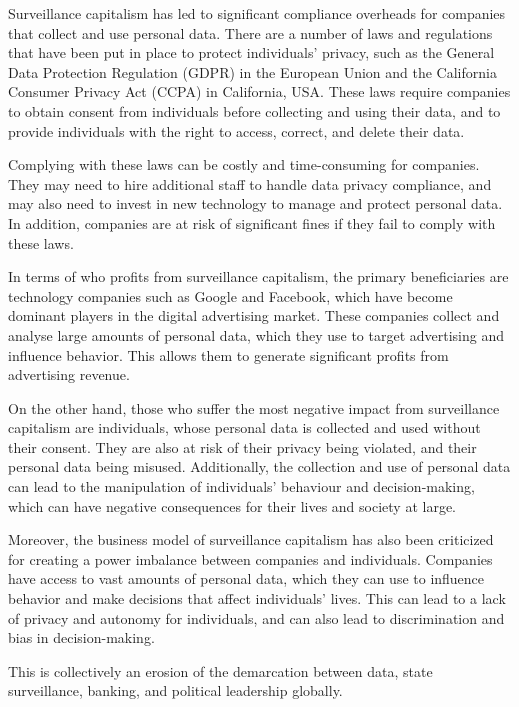 Surveillance capitalism has led to significant compliance overheads for companies that collect and use personal data. There are a number of laws and regulations that have been put in place to protect individuals' privacy, such as the General Data Protection Regulation (GDPR) in the European Union and the California Consumer Privacy Act (CCPA) in California, USA. These laws require companies to obtain consent from individuals before collecting and using their data, and to provide individuals with the right to access, correct, and delete their data.\par 
Complying with these laws can be costly and time-consuming for companies. They may need to hire additional staff to handle data privacy compliance, and may also need to invest in new technology to manage and protect personal data. In addition, companies are at risk of significant fines if they fail to comply with these laws.\par
In terms of who profits from surveillance capitalism, the primary beneficiaries are technology companies such as Google and Facebook, which have become dominant players in the digital advertising market. These companies collect and analyse large amounts of personal data, which they use to target advertising and influence behavior. This allows them to generate significant profits from advertising revenue.\par
On the other hand, those who suffer the most negative impact from surveillance capitalism are individuals, whose personal data is collected and used without their consent. They are also at risk of their privacy being violated, and their personal data being misused. Additionally, the collection and use of personal data can lead to the manipulation of individuals' behaviour and decision-making, which can have negative consequences for their lives and society at large.\par
Moreover, the business model of surveillance capitalism has also been criticized for creating a power imbalance between companies and individuals. Companies have access to vast amounts of personal data, which they can use to influence behavior and make decisions that affect individuals' lives. This can lead to a lack of privacy and autonomy for individuals, and can also lead to discrimination and bias in decision-making.\par 
This is collectively an erosion of the demarcation between data, state surveillance, banking, and political leadership globally. 
